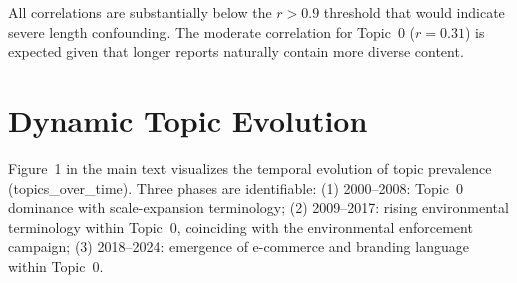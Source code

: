 \documentclass[sustainability,article,submit,moreauthors,pdftex]{mdpi}
\begin{document}
All correlations are substantially below the $r > 0.9$ threshold that would indicate severe length confounding. The moderate correlation for Topic~0 ($r=0.31$) is expected given that longer reports naturally contain more diverse content.

\section{Dynamic Topic Evolution}

Figure~1 in the main text visualizes the temporal evolution of topic prevalence (topics\_over\_time). Three phases are identifiable: (1) 2000--2008: Topic~0 dominance with scale-expansion terminology; (2) 2009--2017: rising environmental terminology within Topic~0, coinciding with the environmental enforcement campaign; (3) 2018--2024: emergence of e-commerce and branding language within Topic~0.


\end{document}

